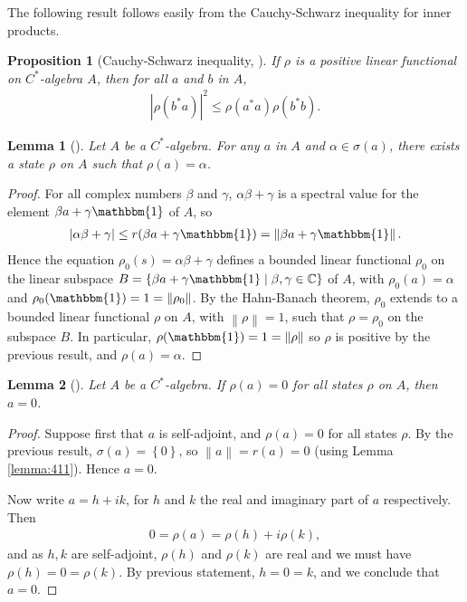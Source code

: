 \documentclass[11pt,a4paper]{report}
\theoremstyle{plain}
\newtheorem{lemma}{Lemma}
\newtheorem*{prop*}{Proposition}
\theoremstyle{definition}
\newcommand{\1}{\mathbbm{1}}
\newcommand{\C}{\mathbb{C}}
\newcommand{\spec}[1]{\sigma(#1)}
\begin{document}
The following result follows easily from the Cauchy-Schwarz inequality for inner 
products.
\begin{prop*}[Cauchy-Schwarz inequality, {\cite[4.3.1]{kadison83}}]
	If $\rho$ is a positive linear functional on $C^\ast$-algebra $A$, then for all 
	$a$ and $b$ in $A$,
	\begin{align*}
		|\rho(b^\ast a)|^2 \leq \rho(a^\ast a)\rho(b^\ast b).
	\end{align*}
\end{prop*}


\begin{lemma}[{\cite[4.3.3]{kadison83}}]\label{lemma:433}
	Let $A$ be a $C^\ast$-algebra. For any $a$ in $A$ and $\alpha\in\spec{a}$, there 
	exists a state $\rho$ on $A$ such that $\rho(a)=\alpha$.
\end{lemma}
\begin{proof}
	For all complex numbers $\beta$ and $\gamma$, $\alpha\beta+\gamma$ is a spectral 
	value for the element $\beta a+\gamma\1$ of $A$, so 
	\begin{align*}
		|\alpha\beta+\gamma|\leq r(\beta a+\gamma\1)=\left\|\beta a+\gamma\1\right\|.
	\end{align*} 
	Hence the equation $\rho_0(s)=\alpha\beta+\gamma$ defines a bounded linear 
	functional $\rho_0$ on the linear subspace $B= \left\{\beta a+\gamma\1 \mid 
	\beta,\gamma\in\C\right\}$ of $A$, with $\rho_0(a) =\alpha$ and 
	$\rho_0(\1)=1=\left\|\rho_0\right\|$. By the Hahn-Banach theorem, $\rho_0$ 
	extends to a bounded linear functional $\rho$ on $A$, with 
	$\left\|\rho\right\|=1$, such that $\rho=\rho_0$ on the subspace $B$. In 
	particular, $\rho(\1)=1=\left\|\rho\right\|$ so $\rho$ is positive by the 
	previous result, and $\rho(a)=\alpha$.
\end{proof}

\begin{lemma}[{\cite[4.3.4,(i)]{kadison83}}]\label{lemma:state1}
	Let $A$ be a $C^\ast$-algebra. If $\rho(a)=0$ for all states $\rho$ on $A$, 
	then $a=0$.
\end{lemma}
\begin{proof}
	Suppose first that $a$ is self-adjoint, and $\rho(a)=0$ for all states $\rho$. 
	By the previous result, $\spec{a}=\left\{0\right\}$, so 
	$\left\|a\right\|=r(a)=0$ (using Lemma \ref{lemma:411}). Hence $a=0$.

	Now write $a=h+ik$, for $h$ and $k$ the real and imaginary part of $a$ 
	respectively. Then
	\begin{align*}
		0=\rho(a)=\rho(h)+i\rho(k),
	\end{align*}
	and as $h,k$ are self-adjoint, $\rho(h)$ and $\rho(k)$ are real and we must have 
	$\rho(h)=0=\rho(k)$. By previous statement, $h=0=k$, and we conclude that $a=0$.
\end{proof}
\end{document}
